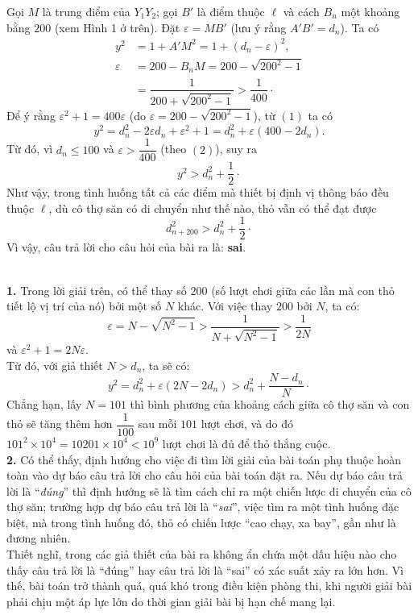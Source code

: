 \begin{bt}
{		Gọi $M$ là trung điểm của $Y_1Y_2$; gọi $B'$ là điểm thuộc $\ell$ và cách $B_n$ một khoảng bằng $200$ (xem Hình 1 ở trên). Đặt $\varepsilon=MB'$ (lưu ý rằng $A'B'=d_n$). Ta có {\allowdisplaybreaks\begin{align*}
				y^2&=1+A'M^2=1+\left(d_n-\varepsilon\right)^2,\tag{1}\\ 
				\varepsilon&=200-B_nM=200-\sqrt{200^2-1}\\
				&=\dfrac{1}{200+\sqrt{200^2-1}}>\dfrac{1}{400}\cdot\tag{2}
		\end{align*}}
		Để ý rằng $\varepsilon^2+1=400\varepsilon$ (do $\varepsilon=200-\sqrt{200^2-1}$), từ $(1)$ ta có $$y^2=d_n^2-2\varepsilon d_n+\varepsilon^2+1=d_n^2+\varepsilon(400-2d_n).$$
		Từ đó, vì $d_n\le 100$ và $\varepsilon>\dfrac{1}{400}$ (theo $(2)$), suy ra $$y^2>d_n^2+\dfrac{1}{2}\cdot$$
		Như vậy, trong tình huống tất cả các điểm mà thiết bị định vị thông báo đều thuộc $\ell$, dù cô thợ săn có di chuyển như thế nào, thỏ vẫn có thể đạt được $$d_{n+200}^2>d_n^2+\dfrac{1}{2}\cdot$$
		Vì vậy, câu trả lời cho câu hỏi của bài ra là: \textbf{sai}.
		\begin{nx}\text{}\\
			\textbf{1.} Trong lời giải trên, có thể thay số $200$ (số lượt chơi giữa các lần mà con thỏ tiết lộ vị trí của nó) bởi một số $N$ khác. Với việc thay $200$ bởi $N$, ta có: $$\varepsilon=N-\sqrt{N^2-1}>\dfrac{1}{N+\sqrt{N^2-1}}>\dfrac{1}{2N}$$ và $\varepsilon^2+1=2N\varepsilon$.\\
			Từ đó, với giả thiết $N>d_n$, ta sẽ có: $$y^2=d_n^2+\varepsilon(2N-2d_n)>d_n^2+\dfrac{N-d_n}{N}\cdot$$
			Chẳng hạn, lấy $N=101$ thì bình phương của khoảng cách giữa cô thợ săn và con thỏ sẽ tăng thêm hơn $\dfrac{1}{100}$ sau mỗi $101$ lượt chơi, và do đó $101^2\times 10^4=10201\times 10^4<10^9$ lượt chơi là đủ để thỏ thắng cuộc.\\
			\textbf{2.} Có thể thấy, định hướng cho việc đi tìm lời giải của bài toán phụ thuộc hoàn toàn vào dự báo câu trả lời cho câu hỏi của bài toán đặt ra. Nếu dự báo câu trả lời là ``\textit{đúng}'' thì định hướng sẽ là tìm cách chỉ ra một chiến lược di chuyển của cô thợ săn; trường hợp dự báo câu trả lời là ``\textit{sai}'', việc tìm ra một tình huống đặc biệt, mà trong tình huống đó, thỏ có chiến lược ``cao chạy, xa bay'', gần như là đương nhiên.\\
			Thiết nghĩ, trong các giả thiết của bài ra không ẩn chứa một dấu hiệu nào cho thấy câu trả lời là ``đúng'' hay câu trả lời là ``sai'' có xác suất xảy ra lớn hơn. Vì thế, bài toán trở thành quá, quá khó trong điều kiện phòng thi, khi người giải bài phải chịu một áp lực lớn do thời gian giải bài bị hạn chế mang lại.\\

\end{nx}}
\end{bt}
